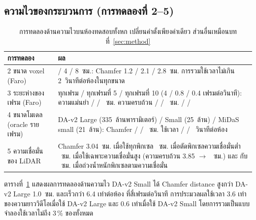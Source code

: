 \subsection{ความไวของกระบวนการ (การทดลองที่ 2--5)}\label{sec:secondary}
\begin{table}[t]
\centering\small
\caption{การทดลองด้านความไวบนห้องทดสอบทั้งหก เปลี่ยนค่าตั้งเพียงค่าเดียว ส่วนอื่นเหมือนบทที่~\ref{sec:method}}
\label{tab:secondary}
\begin{tabularx}{\columnwidth}{@{}l>{\raggedright\arraybackslash}X@{}}
\toprule
การทดลอง & ผล \\
\midrule
2 ขนาด voxel (Faro) & 2 / 4 / 8~ซม.: Chamfer 1.2 / 2.1 / 2.8~ซม. การรวมใช้เวลาไม่เกิน 2~วินาทีต่อห้องในทุกขนาด \\
3 ระยะห่างของเฟรม (Faro) & ทุกเฟรม / ทุกเฟรมที่ 5 / ทุกเฟรมที่ 10 (4 / 0.8 / 0.4 เฟรมต่อวินาที):
ความแม่นยำ \rsSTRGTONEACC{} / \rsSTRGTFIVEACC{} / \rsSTRGTTENACC{}~ซม.
ความครบถ้วน \rsSTRGTONECOMP{} / \rsSTRGTFIVECOMP{} / \rsSTRGTTENCOMP{}~ซม.
\fscore{} \rsSTRGTONEF{} / \rsSTRGTFIVEF{} / \rsSTRGTTENF{} \\
4 ขนาดโมเดล (oracle รายเฟรม) & \mbox{DA-v2} Large (335~ล้านพารามิเตอร์) / Small (25~ล้าน) / MiDaS small (21~ล้าน):
Chamfer \rsDALARGECM{} / \rsDASMALLCM{} / \rsMIDASCM{}~ซม. ใช้เวลา \rsDALARGESCAN{} / \rsDASMALLSCAN{} /
\rsMIDASSCAN{}~วินาทีต่อห้อง \\
5 ความเชื่อมั่นของ LiDAR & Chamfer 3.04~ซม. เมื่อใช้ทุกพิกเซล \rsCONFONECM{}~ซม. เมื่อตัดพิกเซลความเชื่อมั่นต่ำ
\rsCONFTWOCM{}~ซม. เมื่อใช้เฉพาะความเชื่อมั่นสูง (ความครบถ้วน 3.85 $\rightarrow$ \rsCONFTWOCOMP{}~ซม.)
และ \rsWOTFCM{} กับ \rsWZOTCM{}~ซม. เมื่อถ่วงน้ำหนักพิกเซลตามความเชื่อมั่น \\
\bottomrule
\end{tabularx}
\end{table}

ตารางที่~\ref{tab:secondary} แสดงผลการทดลองด้านความไว \mbox{DA-v2} Small ได้ Chamfer distance
สูงกว่า \mbox{DA-v2} Large 1.0~ซม. และเร็วกว่า 6.4 เท่าต่อห้อง ที่สี่เฟรมต่อวินาที
การประมวลผลใช้เวลา 3.6 เท่าของความยาววิดีโอเมื่อใช้ \mbox{DA-v2} Large และ 0.6 เท่าเมื่อใช้ \mbox{DA-v2} Small
โดยการรวมเป็นแบบจำลองใช้เวลาไม่ถึง 3\,\% ของทั้งหมด

